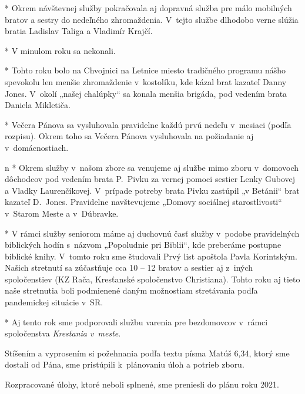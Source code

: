* 
Okrem návštevnej služby pokračovala aj dopravná služba pre málo mobilných bratov a sestry do nedeľného zhromaždenia. V~tejto službe dlhodobo verne slúžia bratia Ladislav Taliga a Vladimír Krajčí.

* 
V minulom roku sa nekonali.

* 
Tohto roku bolo na Chvojnici na Letnice miesto tradičného programu nášho spevokolu len menšie zhromaždenie v~kostolíku, kde kázal brat kazateľ Danny Jones. V~okolí „našej chalúpky“ sa konala menšia brigáda, pod vedením brata Daniela Mikletiča.

* 
Večera Pánova sa vysluhovala pravidelne každú prvú nedeľu v~mesiaci (podľa rozpisu). Okrem toho sa Večera Pánova vysluhovala na požiadanie aj v~domácnostiach.
\enditems


\begitems \style n
* 
Okrem služby v~našom zbore sa venujeme aj službe mimo zboru v~domovoch dôchodcov pod vedením brata P.~Pivku za vernej pomoci sestier Lenky Gubovej a Vladky Laurenčíkovej. V~prípade potreby brata Pivku zastúpil „v Betánii“ brat kazateľ D.~Jones. Pravidelne navštevujeme „Domovy sociálnej starostlivosti“ v~Starom Meste a v~Dúbravke.

* 
V rámci služby seniorom máme aj duchovnú časť služby v~podobe pravidelných biblických hodín s~názvom „Popoludnie pri Biblii“, kde preberáme postupne biblické knihy. V~tomto roku sme študovali Prvý list apoštola Pavla Korintským. Našich stretnutí sa zúčastňuje cca 10 -- 12 bratov a sestier aj z~iných spoločenstiev (KZ Rača, Kresťanské spoločenstvo Christiana). Tohto roku aj tieto naše stretnutia boli podmienené daným možnostiam stretávania podľa pandemickej situácie v~SR.

* 
    Aj tento rok sme podporovali službu varenia pre bezdomovcov v~rámci spoločenstva {\it Kresťania v~meste}.
\enditems



Stíšením a vyprosením si požehnania podľa textu písma Matúš 6,34, ktorý sme dostali od Pána, sme pristúpili k~plánovaniu úloh a potrieb zboru.

Rozpracované úlohy, ktoré neboli splnené, sme preniesli do plánu roku 2021.


